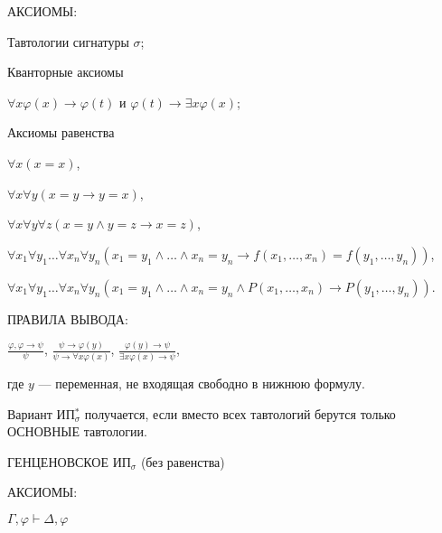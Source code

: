 \documentclass[a4paper,11pt]{article}
\begin{document}
АКСИОМЫ: 

Тавтологии сигнатуры $\sigma$; 
\medskip

Кванторные аксиомы 

$\forall x \varphi(x)\rightarrow
\varphi(t)$ и $\varphi(t)\rightarrow \exists x \varphi(x)$;
\medskip

Аксиомы равенства 

$\forall x (x = x)$, 

$\forall x \forall y(x = y
\rightarrow y = x)$, 

$\forall x \forall y\forall z (x = y \land y
= z \rightarrow x = z)$, 
\medskip

$\forall x_1 \forall y_1\ldots \forall
x_n \forall y_n (x_1 = y_1 \land \ldots \land x_n = y_n
\rightarrow f(x_1,\ldots,x_n) = f(y_1,\ldots, y_n))$, 
\medskip

$\forall x_1
\forall y_1\ldots\forall x_n \forall y_n (x_1 = y_1 \land \ldots
\land x_n = y_n \land P(x_1,\ldots, x_n) \rightarrow
P(y_1,\ldots, y_n))$.
\medskip

ПРАВИЛА ВЫВОДА:
\medskip

$\frac{\varphi,\varphi\rightarrow\psi}{\psi}$,\;\;\;
$\frac{\psi\rightarrow \varphi(y)}{\psi\rightarrow\forall
x\varphi(x)}$, \;\;\;
$\frac{\varphi(y)\rightarrow\psi}{\exists
x\varphi(x)\rightarrow\psi}$, 
\medskip

где $y$ --- переменная, не входящая свободно в нижнюю формулу.
\medskip

Вариант ИП$^*_\sigma$ получается, если вместо всех тавтологий берутся только ОСНОВНЫЕ тавтологии.

\pagebreak


ГЕНЦЕНОВСКОЕ  ИП$_\sigma$ (без равенства)

АКСИОМЫ: 
\medskip

$\Gamma,\varphi\vdash \Delta,\varphi$

\medskip
\end{document}
